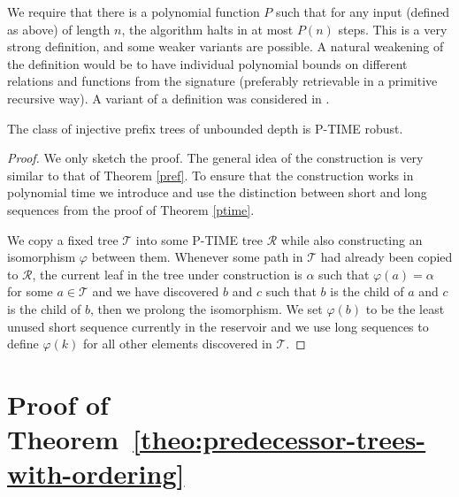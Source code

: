 \documentclass[a4paper,UKenglish,cleveref, autoref, thm-restate]{lipics-v2021}
\begin{document}
We require that there is a polynomial function $P$ such that for any input (defined as above) of length $n$, the algorithm halts in at most $P(n)$ steps. This is a very strong definition, and some weaker variants are possible. A natural weakening of the definition would be to have individual polynomial bounds on different relations and functions from the signature (preferably retrievable in a primitive recursive way). A variant of a definition was considered in \cite{cenzer_feasibly}.

\begin{theorem}
    The class of injective prefix trees of unbounded depth is P-TIME robust.
\end{theorem}

\begin{proof}
    We only sketch the proof. The general idea of the construction is very similar to that of Theorem \ref{pref}. To ensure that the construction works in polynomial time we introduce and use the distinction between short and long sequences from the proof of Theorem \ref{ptime}.

    We copy a fixed tree $\mathcal{T}$ into some P-TIME tree $\mathcal{R}$ while also constructing an isomorphism $\varphi$ between them. Whenever some path in $\mathcal{T}$ had already been copied to $\mathcal{R}$, the current leaf in the tree under construction is $\alpha$ such that $\varphi(a)=\alpha$ for some $a \in \mathcal{T}$ and we have discovered $b$ and $c$ such that $b$ is the child of $a$ and $c$ is the child of $b$, then we prolong the isomorphism. We set $\varphi(b)$ to be the least unused short sequence currently in the reservoir and we use long sequences to define $\varphi(k)$ for all other elements discovered in $\mathcal{T}$.       
\end{proof}


\section{Proof of Theorem~\ref{theo:predecessor-trees-with-ordering}}\label{appendix:RPO-trees}

\theoRPOtrees*
\end{document}
